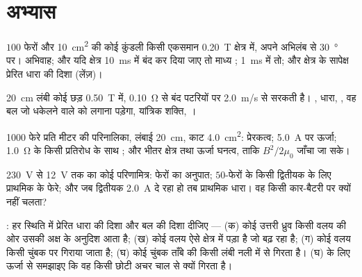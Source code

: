 \section{अभ्यास}

\begin{exercise}[$\star$]\label{exo:b1:induction:1}
$100$ फेरों और \qty{10}{cm^2} की कोई कुंडली किसी एकसमान \qty{0.20}{T} क्षेत्र
में, अपने अभिलंब से \qty{30}{\degree} पर। अभिवाह; और यदि क्षेत्र
\qty{10}{ms} में बंद कर दिया जाए तो माध्य ; \qty{1}{ms} में
तो; और क्षेत्र के सापेक्ष प्रेरित धारा की दिशा (लेंज़)।
\end{exercise}

\begin{exercise}[$\star$]\label{exo:b1:induction:2}
\qty{20}{cm} लंबी कोई छड़ \qty{0.50}{T} में, \qty{0.10}{\ohm} से बंद पटरियों
पर \qty{2.0}{m/s} से सरकती है। , धारा, , वह बल जो
धकेलने वाले को लगाना पड़ेगा, यांत्रिक शक्ति, ।
\end{exercise}

\begin{exercise}[$\star$]\label{exo:b1:induction:3}
\num{1000} फेरे प्रति मीटर की परिनालिका, लंबाई \qty{20}{cm}, काट \qty{4.0}{cm^2}:
प्रेरकत्व; \qty{5.0}{A} पर ऊर्जा; \qty{1.0}{\ohm} के किसी प्रतिरोध के साथ
; और भीतर क्षेत्र तथा ऊर्जा घनत्व, ताकि $B^2/2\mu_0$ जाँचा जा सके।
\end{exercise}

\begin{exercise}[$\star$]\label{exo:b1:induction:4}
\qty{230}{V} से \qty{12}{V} तक का कोई परिणामित्र: फेरों का अनुपात;
$50$-फेरों के किसी द्वितीयक के लिए प्राथमिक के फेरे; और जब द्वितीयक
\qty{2.0}{A} दे रहा हो तब प्राथमिक धारा। वह किसी कार-बैटरी पर क्यों नहीं चलता?
\end{exercise}

\begin{exercise}[$\star\star$]\label{exo:b1:induction:5}
: हर स्थिति में प्रेरित धारा की दिशा और बल की दिशा दीजिए ---
(क) कोई उत्तरी ध्रुव किसी वलय की ओर उसकी अक्ष के अनुदिश आता है; (ख) कोई
वलय ऐसे क्षेत्र में पड़ा है जो बढ़ रहा है; (ग) कोई वलय किसी चुंबक पर गिराया
जाता है; (घ) कोई चुंबक ताँबे की किसी लंबी नली में से गिरता है। (घ) के लिए
ऊर्जा से समझाइए कि वह किसी छोटी अचर चाल से क्यों गिरता है।
\end{exercise}

